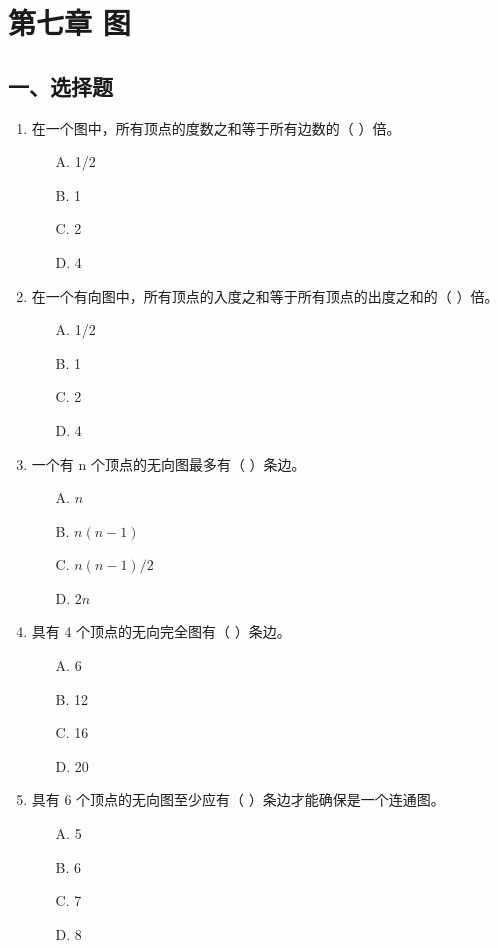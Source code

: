 \documentclass[12pt, a4paper]{article}
\begin{document}
\section{第七章 图}

\subsection*{一、选择题}
\begin{enumerate}
    \item 在一个图中，所有顶点的度数之和等于所有边数的（ ）倍。
    \begin{enumerate}
        \item[A.] 1/2
        \item[B.] 1
        \item[C.] 2
        \item[D.] 4
    \end{enumerate}
    
    \item 在一个有向图中，所有顶点的入度之和等于所有顶点的出度之和的（ ）倍。
    \begin{enumerate}
        \item[A.] 1/2
        \item[B.] 1
        \item[C.] 2
        \item[D.] 4
    \end{enumerate}
    
    \item 一个有 n 个顶点的无向图最多有（ ）条边。
    \begin{enumerate}
        \item[A.] $n$
        \item[B.] $n(n-1)$
        \item[C.] $n(n-1)/2$
        \item[D.] $2n$
    \end{enumerate}
    
    \item 具有 4 个顶点的无向完全图有（ ）条边。
    \begin{enumerate}
        \item[A.] 6
        \item[B.] 12
        \item[C.] 16
        \item[D.] 20
    \end{enumerate}
    
    \item 具有 6 个顶点的无向图至少应有（ ）条边才能确保是一个连通图。
    \begin{enumerate}
        \item[A.] 5
        \item[B.] 6
        \item[C.] 7
        \item[D.] 8
    \end{enumerate}
    

\end{enumerate}
\end{document}
